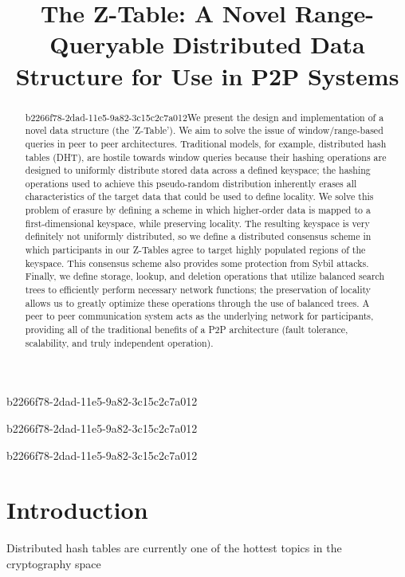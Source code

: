 \documentclass[12pt]{article}
\title{The Z-Table: A Novel Range-Queryable Distributed Data Structure for Use in P2P Systems}
\begin{document}
\maketitle
b2266f78-2dad-11e5-9a82-3c15c2c7a012
\begin{abstract}
b2266f78-2dad-11e5-9a82-3c15c2c7a012We present the design and implementation of a novel data structure (the 'Z-Table'). We aim to solve the issue of window/range-based queries in peer to peer architectures. Traditional models, for example,  distributed hash tables (DHT), are hostile towards window queries because their hashing operations are designed to uniformly distribute stored data across a defined keyspace; the hashing operations used to achieve this pseudo-random distribution inherently erases all characteristics of the target data that could be used to define locality. We solve this problem of erasure by defining a scheme in which higher-order data is mapped to a first-dimensional keyspace, while preserving locality. The resulting keyspace is very definitely not uniformly distributed, so we define a distributed consensus scheme in which participants in our Z-Tables agree to target highly populated regions of the keyspace. This consensus scheme also provides some protection from Sybil attacks. Finally, we define storage, lookup, and deletion operations that utilize balanced search trees to efficiently perform necessary network functions; the preservation of locality allows us to greatly optimize these operations through the use of balanced trees. A peer to peer communication system acts as the underlying network for participants, providing all of the traditional benefits of a P2P architecture (fault tolerance, scalability, and truly independent operation).
\end{abstract}
b2266f78-2dad-11e5-9a82-3c15c2c7a012

b2266f78-2dad-11e5-9a82-3c15c2c7a012\newpage
\section{Introduction}
Distributed hash tables are currently one of the hottest topics in the cryptography space~\cite{Stoica:2001dj,Rowstron:2001ea,Ratnasamy:2001wn}

\printbibliography
\end{document}
